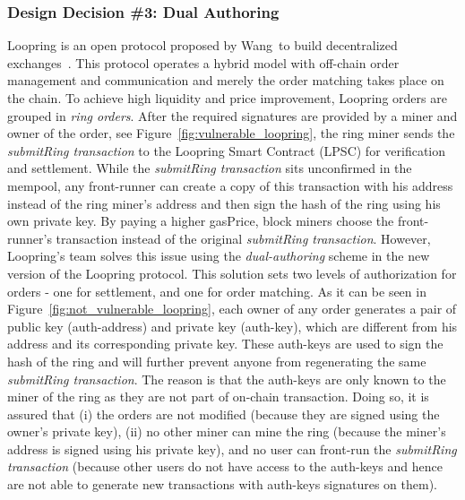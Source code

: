 \subsubsection{Design Decision \#3: Dual Authoring\newline}

Loopring is an open protocol proposed by Wang~\etal to build decentralized exchanges~\cite{wang2018loopring}. This protocol operates a hybrid model with off-chain order management and communication and merely the order matching takes place on the chain. To achieve high liquidity and price improvement, Loopring orders are grouped in \emph{ring orders}. After the required signatures are provided by a miner and owner of the order, see Figure~\ref{fig:vulnerable_loopring}, the ring miner sends the \emph{submitRing transaction} to the Loopring Smart Contract (LPSC) for verification and settlement. While the \emph{submitRing transaction} sits unconfirmed in the mempool, any front-runner can create a copy of this transaction with his address instead of the ring miner's address and then sign the hash of the ring using his own private key. By paying a higher gasPrice, block miners choose the front-runner's transaction instead of the original \emph{submitRing transaction}. However, Loopring's team solves this issue using the \emph{dual-authoring} scheme in the new version of the Loopring protocol. This solution sets two levels of authorization for orders - one for settlement, and one for order matching. As it can be seen in Figure~\ref{fig:not_vulnerable_loopring}, each owner of any order generates a pair of public key (auth-address) and private key (auth-key), which are different from his address and its corresponding private key. These auth-keys are used to sign the hash of the ring and will further prevent anyone from regenerating the same \emph{submitRing transaction}. The reason is that the auth-keys are only known to the miner of the ring as they are not part of on-chain transaction. Doing so, it is assured that (i) the orders are not modified (because they are signed using the owner's private key), (ii) no other miner can mine the ring (because the miner's address is signed using his private key), and no user can front-run the \emph{submitRing transaction} (because other users do not have access to the auth-keys and hence are not able to generate new transactions with auth-keys signatures on them).

